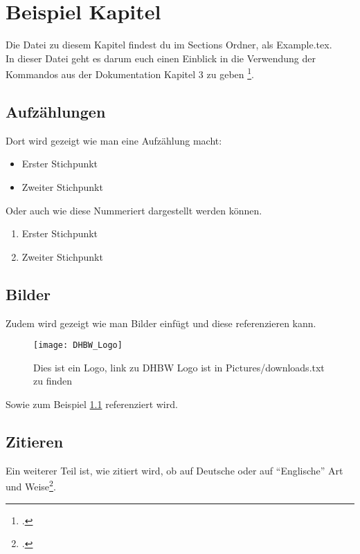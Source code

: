 \chapter{Beispiel Kapitel}
Die Datei zu diesem Kapitel findest du im Sections Ordner, als Example.tex.\\
In dieser Datei geht es darum euch einen Einblick in die Verwendung der Kommandos aus der Dokumentation Kapitel 3 zu geben \footcite{doku}.
\section{Aufzählungen}
Dort wird gezeigt wie man eine Aufzählung macht:
\begin{itemize}
 \item Erster Stichpunkt
 \item Zweiter Stichpunkt
\end{itemize}
Oder auch wie diese Nummeriert dargestellt werden können.
\begin{enumerate}
 \item Erster Stichpunkt
 \item Zweiter Stichpunkt
\end{enumerate}
\section{Bilder}
Zudem wird gezeigt wie man Bilder einfügt und diese referenzieren kann.
\begin{center}
 \begin{figure}[h!]
  \centering
  \texttt{[image: DHBW\_Logo]}
  \caption{Dies ist ein Logo, link zu DHBW Logo ist in Pictures/downloads.txt zu finden}
  \label{fig:dhbwlogo}
 \end{figure}
\end{center}
Sowie zum Beispiel \ref{fig:dhbwlogo} referenziert wird.
\section{Zitieren}
Ein weiterer Teil ist, wie zitiert wird, ob auf \glqq{}Deutsche\grqq{} oder auf ``Englische'' Art und Weise\footcite[3.2]{doku}.
